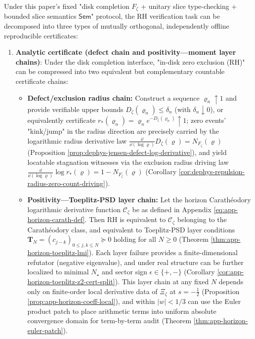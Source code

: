 \begin{theorem}\label{thm:dephys-rh-certificate-audit-loop}
Under this paper's fixed "disk completion \(F_\zeta\) + unitary slice type-checking + bounded slice semantics \(\mathsf{Sem}\)" protocol, the RH verification task can be decomposed into three types of mutually orthogonal, independently offline reproducible certificates:
\begin{enumerate}
  \item \textbf{Analytic certificate (defect chain and positivity—moment layer chains)}:
  Under the disk completion interface, "in-disk zero exclusion (RH)" can be compressed into two equivalent but complementary countable certificate chains:
  \begin{itemize}
    \item \textbf{Defect/exclusion radius chain:}
    Construct a sequence \(\varrho_n\uparrow 1\) and provide verifiable upper bounds \(D_\zeta(\varrho_n)\le \delta_n\) (with \(\delta_n\downarrow 0\)), or equivalently certificate
    \(
    r_{\ast}(\varrho_n)=\varrho_n e^{-D_\zeta(\varrho_n)}\uparrow 1
    \);
    zero events' "kink/jump" in the radius direction are precisely carried by the logarithmic radius derivative law \( \frac{\dd}{\dd(\log\varrho)}D_\zeta(\varrho)=N_{F_\zeta}(\varrho) \) (Proposition \ref{prop:dephys-jensen-defect-log-derivative}), and yield locatable stagnation witnesses via the exclusion radius driving law \( \frac{\dd}{\dd(\log\varrho)}\log r_\ast(\varrho)=1-N_{F_\zeta}(\varrho) \) (Corollary \ref{cor:dephys-repulsion-radius-zero-count-driving}).
    \item \textbf{Positivity—Toeplitz-PSD layer chain:}
    Let the horizon Carathéodory logarithmic derivative function \(\mathscr{C}_\zeta\) be as defined in Appendix \eqref{eq:app-horizon-carath-def}.
    Then RH is equivalent to \(\mathscr{C}_\zeta\) belonging to the Carathéodory class, and equivalent to Toeplitz-PSD layer conditions
    \(
    \mathbf{T}_N=(c_{j-k})_{0\le j,k\le N}\succeq 0
    \)
    holding for all \(N\ge 0\) (Theorem \ref{thm:app-horizon-toeplitz-lmi}).
    Each layer failure provides a finite-dimensional refutator (negative eigenvalue), and under real structure can be further localized to minimal \(N_\star\) and sector sign \(\epsilon\in\{+,-\}\) (Corollary \ref{cor:app-horizon-toeplitz-z2-cert-split}).
    This layer chain at any fixed \(N\) depends only on finite-order local derivative data of \(\Xi_\zeta\) at \(s=-\tfrac12\) (Proposition \ref{prop:app-horizon-coeff-local}), and within \(|w|<1/3\) can use the Euler product patch to place arithmetic terms into uniform absolute convergence domain for term-by-term audit (Theorem \ref{thm:app-horizon-euler-patch}).

\end{itemize}
\end{enumerate}
\end{theorem}
